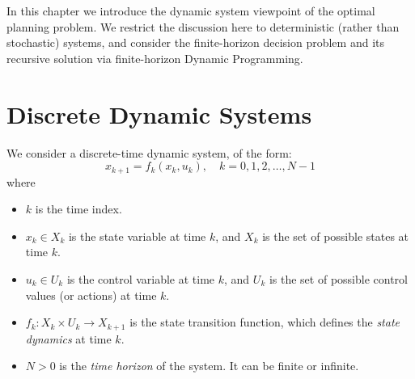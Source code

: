 %
%
%
%
%
%
%
%

In this chapter we introduce the dynamic system viewpoint of the optimal planning problem. We restrict the discussion here to deterministic (rather than stochastic) systems, and consider the finite-horizon decision problem and its recursive solution via finite-horizon Dynamic Programming.

\section{Discrete Dynamic Systems}
We consider a discrete-time dynamic system, of the form:
\[{x_{k + 1}} = {f_k}({x_k},{u_k}),\quad k = 0,1,2, \ldots ,N - 1\]
where
\begin{itemize}
  \item $k$ is the time index.
  \item ${x_k} \in {X_k}$ is the state variable at time $k$, and $X_k$ is the set of possible states at time $k$.
  \item ${u_k} \in {U_k}$  is the control variable at time $k$, and $U_k$ is the set of possible control values (or actions) at time $k$.
  \item ${f_k}:{X_k} \times {U_k} \to {X_{k + 1}}$ is the state transition function, which defines the \emph{state dynamics} at time $k$.
  \item $N>0$ is the \emph{time horizon} of the system.  It can be finite or infinite.
\end{itemize}
 	

